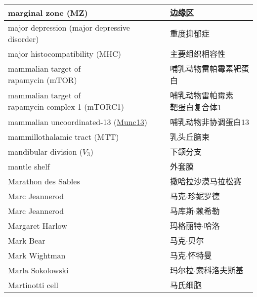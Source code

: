 \begin{longtable}{lll}
	\midrule
	marginal zone (MZ)   && 边缘区  \\
	
	\midrule
	major depression (major depressive disorder)   && 重度抑郁症  \\
	
	\midrule
	major histocompatibility (MHC)   && 主要组织相容性  \\
	
	\midrule
	\makecell[l]{mammalian target of \\rapamycin (mTOR)}   && 哺乳动物雷帕霉素靶蛋白  \\
	
	\midrule
	\makecell[l]{mammalian target of \\rapamycin complex 1 (mTORC1)}   && \makecell[l]{哺乳动物雷帕霉素\\靶蛋白复合体1}  \\
	
	\midrule
	mammalian uncoordinated-13 (\href{https://en.wikipedia.org/wiki/Munc-13}{Munc13})  && 哺乳动物非协调蛋白13  \\
	
	\midrule
	mammillothalamic tract (MTT)  && 乳头丘脑束  \\
	
	\midrule
	mandibular division ($V_3$)   && 下颌分支  \\
	
	\midrule
	mantle shelf   && 外套膜  \\
	
	\midrule
	Marathon des Sables   && 撒哈拉沙漠马拉松赛  \\
	
	\midrule
	Marc Jeannerod   && 马克$\cdot$珍妮罗德  \\
	
	\midrule
	Marc Jeannerod   && 马库斯$\cdot$赖希勒  \\
	
	\midrule
	Margaret Harlow   && 玛格丽特$\cdot$哈洛  \\
	
	\midrule
	Mark Bear   && 马克$\cdot$贝尔  \\
	
	\midrule
	Mark Wightman   && 马克$\cdot$怀特曼  \\
	
	\midrule
	Marla Sokolowski   && 玛尔拉$\cdot$索科洛夫斯基 \\
	
	\midrule
	Martinotti cell   && 马氏细胞 \\
	

\end{longtable}
